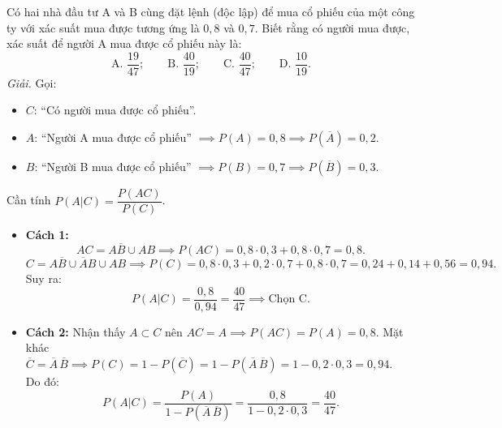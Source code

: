 \begin{vidu}
Có hai nhà đầu tư A và B cùng đặt lệnh (độc lập) để mua cổ phiếu của một công ty với xác suất mua được tương ứng là $0{,}8$ và $0{,}7$. Biết rằng có người mua được, xác suất để người A mua được cổ phiếu này là:
\[
\text{A. } \frac{19}{47}; \qquad \text{B. } \frac{40}{19}; \qquad \text{C. } \frac{40}{47}; \qquad \text{D. } \frac{10}{19}.
\]
\textit{Giải.} Gọi:
\begin{itemize}
    \item $C$: ``Có người mua được cổ phiếu''.
    \item $A$: ``Người A mua được cổ phiếu'' $\implies P(A) = 0{,}8 \implies P(\overline{A}) = 0{,}2$.
    \item $B$: ``Người B mua được cổ phiếu'' $\implies P(B) = 0{,}7 \implies P(\overline{B}) = 0{,}3$.
\end{itemize}
Cần tính $P(A|C) = \dfrac{P(AC)}{P(C)}$.
\begin{itemize}
    \item \textbf{Cách 1:}
    \[
    AC = A\overline{B} \cup AB \implies P(AC) = 0{,}8 \cdot 0{,}3 + 0{,}8 \cdot 0{,}7 = 0{,}8.
    \]
    \[
    C = A\overline{B} \cup \overline{A}B \cup AB \implies P(C) = 0{,}8 \cdot 0{,}3 + 0{,}2 \cdot 0{,}7 + 0{,}8 \cdot 0{,}7 = 0{,}24 + 0{,}14 + 0{,}56 = 0{,}94.
    \]
    Suy ra:
    \[
    P(A|C) = \frac{0{,}8}{0{,}94} = \frac{40}{47} \implies \text{Chọn C.}
    \]
    \item \textbf{Cách 2:}
    Nhận thấy $A \subset C$ nên $AC = A \implies P(AC) = P(A) = 0{,}8$.
    Mặt khác $\overline{C} = \overline{A}\,\overline{B} \implies P(C) = 1 - P(\overline{C}) = 1 - P(\overline{A}\,\overline{B}) = 1 - 0{,}2 \cdot 0{,}3 = 0{,}94$.\\
    Do đó:
    \[
    P(A|C) = \frac{P(A)}{1 - P(\overline{A}\,\overline{B})} = \frac{0{,}8}{1 - 0{,}2 \cdot 0{,}3} = \frac{40}{47}.
    \]
\end{itemize}
\end{vidu}

